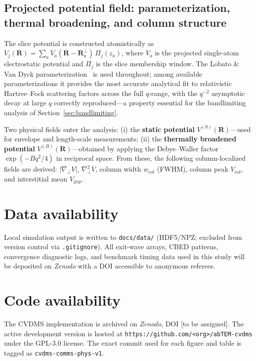 \documentclass[twoside,11pt]{article}
\begin{document}
\subsection{Projected potential field: parameterization, thermal broadening, and column structure}\label{sec:potential-field}

The slice potential is constructed atomistically as $V_j(\mathbf{R})=\sum_a V_a(\mathbf{R}-\mathbf{R}_a^{\perp})\,\Pi_j(z_a)$, where $V_a$ is the projected single-atom electrostatic potential and $\Pi_j$ is the slice membership window. The Lobato \& Van Dyck parameterization~\cite{LobatoVanDyck2014} is used throughout; among available parameterizations it provides the most accurate analytical fit to relativistic Hartree--Fock scattering factors across the full $q$-range, with the $q^{-2}$ asymptotic decay at large $q$ correctly reproduced---a property essential for the bandlimiting analysis of Section~\ref{sec:bandlimiting}.

Two physical fields enter the analysis: (i) the \textbf{static potential} $V^{(0)}(\mathbf{R})$---used for envelope and length-scale measurements; (ii) the \textbf{thermally broadened potential} $V^{(B)}(\mathbf{R})$---obtained by applying the Debye--Waller factor $\exp(-Bq^2/4)$ in reciprocal space. From these, the following column-localized fields are derived: $|\nabla_\perp V|$, $\nabla_\perp^2 V$, column width $w_\text{col}$ (FWHM), column peak $V_\text{col}$, and interstitial mean $V_\text{gap}$.

\section*{Data availability}
Local simulation output is written to {\tt docs/data/} (HDF5/NPZ; excluded from version control via {\tt .gitignore}). All exit-wave arrays, CBED patterns, convergence diagnostic logs, and benchmark timing data used in this study will be deposited on \textit{Zenodo} with a DOI accessible to anonymous referees.

\section*{Code availability}
The CVDMS implementation is archived on \textit{Zenodo}, DOI [to be assigned]. The active development version is hosted at {\tt https://github.com/<org>/abTEM-cvdms} under the GPL-3.0 license. The exact commit used for each figure and table is tagged as {\tt cvdms-comms-phys-v1}.
\end{document}
